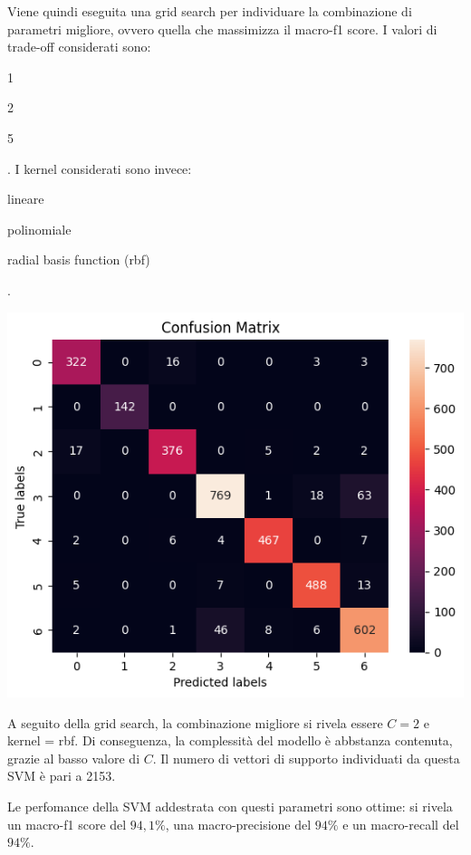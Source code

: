 Viene quindi eseguita una grid search per individuare la combinazione di parametri
migliore, ovvero quella che massimizza il macro-f1 score.
I valori di trade-off considerati sono: \begin{itemize*}
    \item 1
    \item 2
    \item 5
\end{itemize*}.
I kernel considerati sono invece: \begin{itemize*}
    \item lineare
    \item polinomiale
    \item radial basis function (rbf)
\end{itemize*}.

\begin{Figure}
    \centering
    \includegraphics[width=\linewidth]{img/svm_confusion_matrix.png}
\end{Figure}

A seguito della grid search, la combinazione migliore si rivela essere $C=2$ e
kernel = rbf. Di conseguenza, la complessità del modello è abbstanza contenuta,
grazie al basso valore di $C$.
Il numero di vettori di supporto individuati da questa SVM è pari a 2153.

Le perfomance della SVM addestrata con questi parametri sono ottime:
si rivela un macro-f1 score del $94,1\%$, 
una macro-precisione del $94\%$ e un macro-recall del $94\%$.

